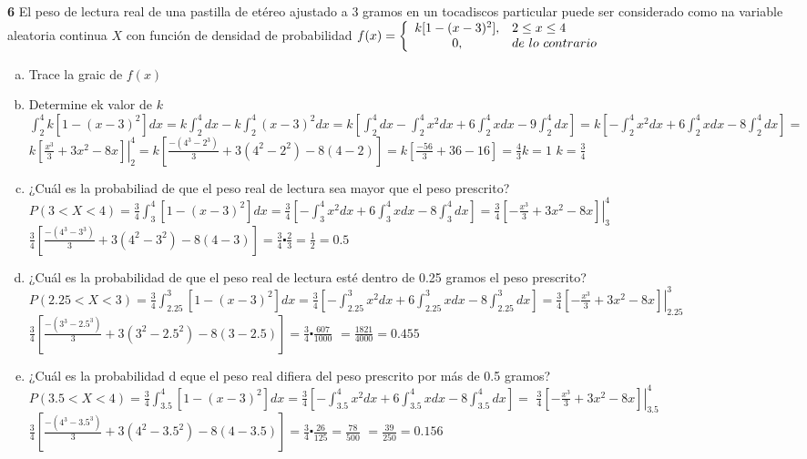 \documentclass[12pt, letterpaper]{article}
\begin{document}
\textbf{6} El peso de lectura real de una pastilla de etéreo ajustado a 3 gramos en un tocadiscos particular puede ser considerado como na variable aleatoria continua $X$ con función de densidad de probabilidad
$f(x)=\left\{\begin{array}{c l}
	k[1-(x-3)^2], & 2\leq x\leq 4\\
	0, & de\ lo\ contrario
\end{array}\right.$
\begin{enumerate}[a)]
	\item Trace la graic de $f(x)$\vskip0.1cm
	\begin{center}
	\end{center}
	\item Determine ek valor de $k$\vskip0.1cm
		$\displaystyle\int_2^4k[1-(x-3)^2]dx=k\int_2^4dx-k\int_2^4(x-3)^2dx=k\left[\int_2^4dx-\int_2^4x^2dx+6\int_2^4xdx-9\int_2^4dx\right]=k\left[-\int_2^4x^2dx+6\int_2^4xdx-8\int_2^4dx \right]=$
		$k\left[\left.\displaystyle\frac{x^3}{3}+3x^2-8x  \right]\right|_2^4= k\left[\displaystyle\frac{-(4^3-2^3)}{3}+3(4^2-2^2)-8(4-2) \right] = k\left[\displaystyle\frac{-56}{3}+36-16 \right]=\displaystyle\frac{4}{3}k=1$\vskip0.1cm
		$k=\displaystyle\frac{3}{4}$
	\item ¿Cuál es la probabiliad de que el peso real de lectura sea mayor que el peso prescrito?\vskip0.1cm
		$P(3<X<4)=\displaystyle\frac{3}{4}\int_3^4[1-(x-3)^2]dx=\frac{3}{4}\left[-\int_3^4x^2dx+6\int_3^4xdx-8\int_3^4dx\right]=\frac{3}{4}\left[\left.-\frac{x^3}{3}+3x^2-8x \right]\right|_3^4$
		$\displaystyle\frac{3}{4}\left[\frac{-(4^3-3^3)}{3}+3(4^2-3^2)-8(4-3)\right]=\frac{3}{4}\centerdot \frac{2}{3}=\frac{1}{2}=0.5$
	\item ¿Cuál es la probabilidad de que el peso real de lectura esté dentro de 0.25 gramos el peso prescrito?\vskip0.1cm
		$P(2.25<X<3)=\displaystyle\frac{3}{4}\int_{2.25}^3[1-(x-3)^2]dx=\frac{3}{4}\left[-\int_{2.25}^3x^2dx+6\int_{2.25}^3xdx-8\int_{2.25}^3dx\right]=\frac{3}{4}\left[\left.-\frac{x^3}{3}+3x^2-8x \right]\right|_{2.25}^3$
		$\displaystyle\frac{3}{4}\left[\frac{-(3^3-2.5^3)}{3}+3(3^2-2.5^2)-8(3-2.5)\right]=\frac{3}{4}\centerdot \frac{607}{1000}$\vskip0.1cm
		$=\displaystyle\frac{1821}{4000}=0.455$
	\item ¿Cuál es la probabilidad d eque el peso real difiera del peso prescrito por más de 0.5 gramos?\vskip0.1cm
	$P(3.5<X<4)=\displaystyle\frac{3}{4}\int_{3.5}^4[1-(x-3)^2]dx=\frac{3}{4}\left[-\int_{3.5}^4x^2dx+6\int_{3.5}^4xdx-8\int_{3.5}^4dx\right]=$\vskip0.1cm
	$\displaystyle\frac{3}{4}\left[\left.-\frac{x^3}{3}+3x^2-8x \right]\right|_{3.5}^4$
	$\displaystyle\frac{3}{4}\left[\frac{-(4^3-3.5^3)}{3}+3(4^2-3.5^2)-8(4-3.5)\right]=\frac{3}{4}\centerdot \frac{26}{125}=\frac{78}{500}$\vskip0.1cm
	$=\displaystyle\frac{39}{250}=0.156$
\end{enumerate}\vskip1cm
\end{document}
